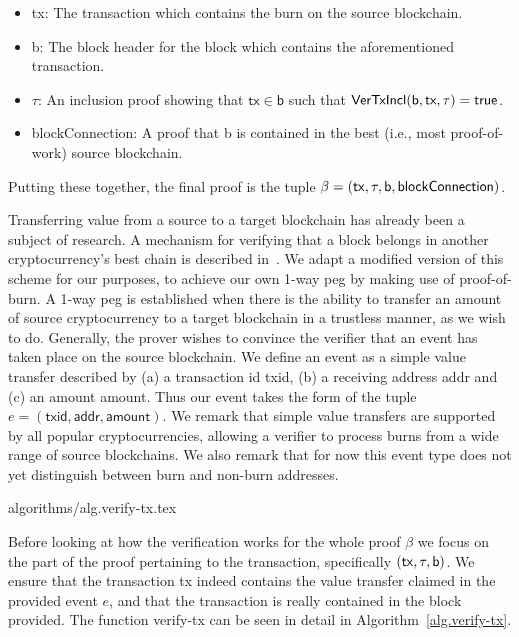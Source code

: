 \begin{itemize}
  \item \textsf{tx}: The transaction which contains the burn on the source blockchain.
  \item \textsf{b}: The block header for the block which contains the aforementioned transaction.
  \item $\tau$: An inclusion proof showing that $\mathsf{tx} \in \mathsf{b}$ such that $\mathsf{VerTxIncl}(\textsf{b}, \textsf{tx}, \tau) = \mathsf{true}$.
  \item \textsf{blockConnection}: A proof that \textsf{b} is contained in the best (i.e., most proof-of-work) source blockchain.
\end{itemize}

Putting these together, the final proof is the tuple $\beta = \sf(tx, \tau, b, block\-Connection)$.

Transferring value from a source to a target blockchain has already been a subject of research. A mechanism for verifying that a block belongs in another cryptocurrency's best chain is described in~\cite{pow-sidechains}. We adapt a modified version of this scheme for our purposes, to achieve our own 1-way peg by making use of proof-of-burn. A 1-way peg is established when there is the ability to transfer an amount of source cryptocurrency to a target blockchain in a trustless manner, as we wish to do. Generally, the prover wishes to convince the verifier that an event has taken place on the source blockchain. We define an event as a simple value transfer described by (a) a transaction id \textsf{txid}, (b) a receiving address \textsf{addr} and (c) an amount \textsf{amount}. Thus our event takes the form of the tuple $e = (\textsf{txid}, \textsf{addr}, \textsf{amount})$. We remark that simple value transfers are supported by all popular cryptocurrencies, allowing a verifier to process burns from a wide range of source blockchains. We also remark that for now this event type does not yet distinguish between burn and non-burn addresses.

{algorithms/alg.verify-tx.tex}

Before looking at how the verification works for the whole proof $\beta$ we focus on the part of the proof pertaining to the transaction, specifically $\sf(tx, \tau, b)$. We ensure that the transaction \textsf{tx} indeed contains the value transfer claimed in the provided event $e$, and that the transaction is really contained in the block provided. The function \textsf{verify-tx} can be seen in detail in Algorithm~\ref{alg.verify-tx}.

